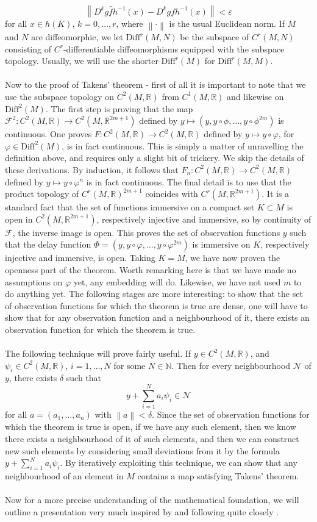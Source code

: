 \documentclass[11pt, a4paper]{memoir}
\newcommand{\mN}{\mathbb{N}}
\newcommand{\mR}{\mathbb{R}}
\newcommand{\norm}[1]{\left\lVert#1\right\rVert}
\begin{document}
$$\norm{D^kg\hat{f}h^{-1}(x)-D^kgfh^{-1}(x)}<\varepsilon$$
for all $x\in h(K)$, $k=0,\ldots,r$, where $\norm{\cdot}$ is the usual Euclidean norm. If $M$ and $N$ are diffeomorphic, we let $\text{Diff}^r(M,N)$ be the subspace of $C^r(M,N)$ consisting of $C^r$-differentiable diffeomorphisms equipped with the subspace topology. Usually, we will use the shorter $\text{Diff}^r(M)$ for $\text{Diff}^r(M,M)$.\\\\
Now to the proof of Takens' theorem - first of all it is important to note that we use the subspace topology on $C^2(M,\mR)$ from $C^1(M,\mR)$ and likewise on $\text{Diff}^2(M)$. The first step is proving that the map $\mathcal{F}^2: C^2(M,\mR)\to C^2(M,\mR^{2m+1})$ defined by $y\mapsto (y,y\circ\phi,\ldots, y\circ \phi^{2m})$ is continuous. One proves $F: C^2(M,\mR)\to C^2(M,\mR)$ defined by $y\mapsto y\circ\varphi$, for $\varphi\in \text{Diff}^2(M)$, is in fact continuous.  This is simply a matter of unravelling the definition above, and requires only a slight bit of trickery. We skip the details of these derivations. By induction, it follows that $F_n:  C^2(M,\mR)\to C^2(M,\mR)$ defined by $y\mapsto y\circ\varphi^n$ is in fact continuous.  The final detail is to use that the product topology of $C^r(M,\mR)^{2m+1}$ coincides with $C^r(M,\mR^{2m+1})$. It is a standard fact that the set of functions immersive on a compact set $K\subset M$ is open in $C^2(M,\mR^{2m+1})$, respectively injective and immersive, so by continuity of $\mathcal{F}$, the inverse image is open. This proves the set of observation functions $y$ such that the delay function $\Phi = (y,y\circ\varphi, \ldots,y\circ\varphi^{2m})$ is immersive on $K$, respectively injective and immersive, is open. Taking $K=M$, we have now proven the openness part of the theorem. Worth remarking here is that we have made no assumptions on $\varphi$ yet, any embedding will do. Likewise, we have not used $m$ to do anything yet. The following stages are more interesting: to show that the set of observation functions for which the theorem is true are dense, one will have to show that for any observation function and a neighbourhood of it, there exists an observation function for which the theorem is true. \\\\
The following technique will prove fairly useful. If $y\in C^2(M,\mR)$, and $\psi_i\in C^2(M,\mR)$, $i=1,\ldots,N$ for some $N\in \mN$. Then for every neighbourhood $\mathcal{N}$ of $y$, there exists $\delta$ such that
$$y+\sum_{i=1}^N a_i\psi_i\in \mathcal{N}$$
for all $a=(a_1,\ldots,a_n)$ with $\norm{a}< \delta$. Since the set of observation functions for which the theorem is true is open, if we have any such element, then we know there exists a neighbourhood of it of such elements, and then we can construct new such elements by considering small deviations from it by the formula $y+\sum_{i=1}^N a_i\psi_i$. By iteratively exploiting this technique, we can show that any neighbourhood of an element in $M$ contains a map satisfying Takens' theorem.\\\\
Now for a more precise understanding of the mathematical foundation, we will outline a presentation very much inspired by and following quite closely \cite{mathFound}.
\end{document}
